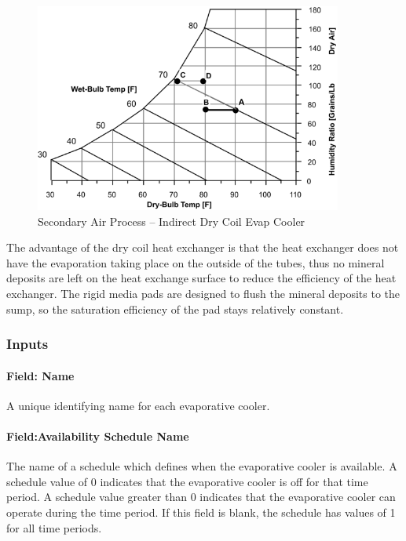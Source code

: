 \begin{figure}[hbtp] %
\centering
\includegraphics[width=0.9\textwidth, height=0.9\textheight, keepaspectratio=true]{media/image420.png}
\caption{Secondary Air Process -- Indirect Dry Coil Evap Cooler \protect \label{fig:secondary-air-process-indirect-dry-coil-evap}}
\end{figure}

The advantage of the dry coil heat exchanger is that the heat exchanger does not have the evaporation taking place on the outside of the tubes, thus no mineral deposits are left on the heat exchange surface to reduce the efficiency of the heat exchanger. The rigid media pads are designed to flush the mineral deposits to the sump, so the saturation efficiency of the pad stays relatively constant.

\subsubsection{Inputs}\label{inputs-2-013}

\paragraph{Field: Name}\label{field-name-2-012}

A unique identifying name for each evaporative cooler.

\paragraph{Field:Availability Schedule Name}\label{fieldavailability-schedule-name-1}

The name of a schedule which defines when the evaporative cooler is available. A schedule value of 0 indicates that the evaporative cooler is off for that time period. A schedule value greater than 0 indicates that the evaporative cooler can operate during the time period. If this field is blank, the schedule has values of 1 for all time periods.

